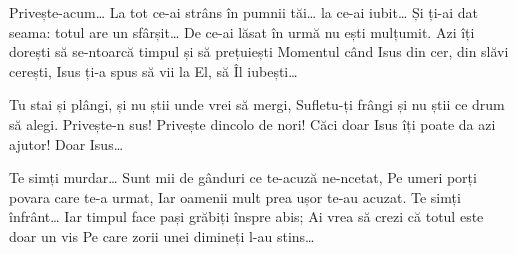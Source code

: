 \beginverse
Privește-acum…
La tot ce-ai strâns în pumnii tăi… la ce-ai iubit…
Și ți-ai dat seama: totul are un sfârșit…
De ce-ai lăsat în urmă nu ești mulțumit.
Azi îți dorești să se-ntoarcă timpul și să prețuiești
Momentul când Isus din cer, din slăvi cerești,
Isus ți-a spus să vii la El, să Îl iubești…
\endverse

\beginchorus
Tu stai și plângi, și nu știi unde vrei să mergi,
Sufletu-ți frângi și nu știi ce drum să alegi.
Privește-n sus!
Privește dincolo de nori!
Căci doar Isus îți poate da azi ajutor!
Doar Isus…
\endchorus

\beginverse
Te simți murdar…
Sunt mii de gânduri ce te-acuză ne-ncetat,
Pe umeri porți povara care te-a urmat,
Iar oamenii mult prea ușor te-au acuzat.
Te simți înfrânt…
Iar timpul face pași grăbiți înspre abis;
Ai vrea să crezi că totul este doar un vis
Pe care zorii unei dimineți l-au stins…
\endverse
\endsong
